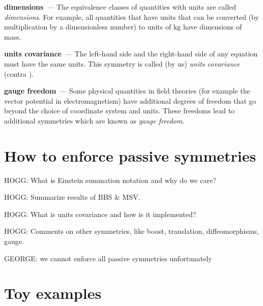 \documentclass[11pt]{article}
\newcommand{\unit}[1]{\mathrm{#1}}
\newcommand{\kg}{\unit{kg}}
\renewcommand{\paragraph}[1]{\medskip\par\noindent\textbf{#1}~---}
\begin{document}
\paragraph{dimensions}
The equivalence classes of quantities with units are called \emph{dimensions}.
For example, all quantities that have units that can be converted (by multiplication by a dimensionless number) to units of $\kg$ have dimensions of mass.

\paragraph{units covariance}
The left-hand side and the right-hand side of any equation must have the same units.
This symmetry is called (by us) \emph{units covariance} (contra \cite{villar2022dimensionless}).

\paragraph{gauge freedom}
Some physical quantities in field theories (for example the vector potential in electromagnetism) have additional degrees of freedom that go beyond the choice of coordinate system and units.
These freedoms lead to additional symmetries which are known as \emph{gauge freedom}.

\section{How to enforce passive symmetries}

HOGG: What is Einstein summation notation and why do we care?

HOGG: Summarize results of BBS \& MSV.

HOGG: What is units covariance and how is it implemented?

HOGG: Comments on other symmetries, like boost, translation, diffeomorphisms, gauge.

GEORGE: we cannot enforce all passive symmetries unfortunately

\section{Toy examples}
\end{document}
